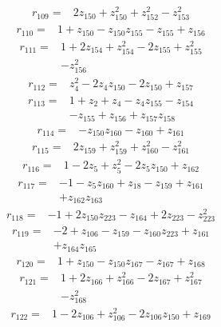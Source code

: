 \begin{align*}
r_{109}={}&2z_{150} +z_{150}^{2} +z_{152}^{2} -z_{153}^{2}
\end{align*}
\begin{align*}
r_{110}={}&1 +z_{150} -z_{150}z_{155} -z_{155} +z_{156}
\end{align*}
\begin{align*}
r_{111}={}&1 +2z_{154} +z_{154}^{2} -2z_{155} +z_{155}^{2}\\
&-z_{156}^{2}
\end{align*}
\begin{align*}
r_{112}={}&z_{4}^{2} -2z_{4}z_{150} -2z_{150} +z_{157}
\end{align*}
\begin{align*}
r_{113}={}&1 +z_{2} +z_{4} -z_{4}z_{155} -z_{154}\\
&-z_{155} +z_{156} +z_{157}z_{158}
\end{align*}
\begin{align*}
r_{114}={}&-z_{150}z_{160} -z_{160} +z_{161}
\end{align*}
\begin{align*}
r_{115}={}&2z_{159} +z_{159}^{2} +z_{160}^{2} -z_{161}^{2}
\end{align*}
\begin{align*}
r_{116}={}&1 -2z_{5} +z_{5}^{2} -2z_{5}z_{150} +z_{162}
\end{align*}
\begin{align*}
r_{117}={}&-1 -z_{5}z_{160} +z_{18} -z_{159} +z_{161}\\
&+z_{162}z_{163}
\end{align*}
\begin{align*}
r_{118}={}&-1 +2z_{150}z_{223} -z_{164} +2z_{223} -z_{223}^{2}
\end{align*}
\begin{align*}
r_{119}={}&-2 +z_{106} -z_{159} -z_{160}z_{223} +z_{161}\\
&+z_{164}z_{165}
\end{align*}
\begin{align*}
r_{120}={}&1 +z_{150} -z_{150}z_{167} -z_{167} +z_{168}
\end{align*}
\begin{align*}
r_{121}={}&1 +2z_{166} +z_{166}^{2} -2z_{167} +z_{167}^{2}\\
&-z_{168}^{2}
\end{align*}
\begin{align*}
r_{122}={}&1 -2z_{106} +z_{106}^{2} -2z_{106}z_{150} +z_{169}
\end{align*}
